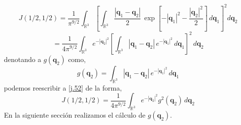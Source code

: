 \documentclass[12pt]{book}
\numberwithin{equation}{chapter}
\def\q{\mathbf{q}}
\def\R{\mathbb{R}}
\begin{document}
$$ J(1/2,1/2)= \frac{1}{\pi^{9/2}} \int_{\R^{3}} \left[\int_{\R^{3}} \frac{|\q_{1}-\q_{2}|}{2}\, \exp \left[ -|\q_{1}|^{2} -\frac{|\q_{2}|^{2}}{2} \right] \,d\q_{1} \right]^{2} d\q_{2} $$
\begin{equation}\label{j.52}
=\frac{1}{4 \pi^{9/2}} \int_{\R^{3}} e^{-|\q_{2}|^{2}} \left[\int_{\R^{3}} |\q_{1} - \q_{2}|\, e^{-|\q_{1}|^{2}} \,d\q_{1} \right]^{2}  \,d\q_{2}
\end{equation} 
denotando a $g(\q_{2})$  como,
\begin{equation}\label{gq2}
g(\q_{2})= \int_{\R^{3}} |\q_{1}-\q_{2}|\, e^{-|\q_{1}|^{2}}\, d\q_{1}
\end{equation}
podemos reescribir a \eqref{j.52} de la forma,
\begin{equation}\label{JGq}
J(1/2,1/2)= \frac{1}{4 \pi^{9/2}} \int_{\R^{3}} e^{-|\q_{2}|^{2}} g^{2}(\q_{2})  \,d\q_{2}
\end{equation}
En la siguiente secci\'on realizamos el c\'alculo de $g(\q_{2})$.\\
\end{document}
